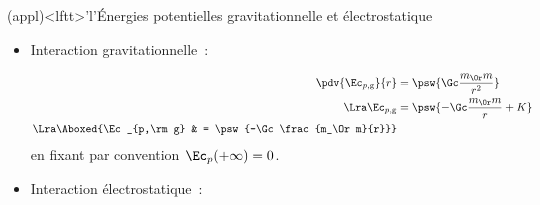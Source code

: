 \documentclass[../../main/main.tex]{subfiles}
\begin{document}
\begin{tcb*}(appl)<lftt>'l'{Énergies potentielles gravitationnelle et
	électrostatique}
	\begin{itemize}
		\item Interaction gravitationnelle~:
		      \vspace{-15pt}
		      \smallbreak
		      \begin{minipage}{0.45\linewidth}
			      \begin{align*}
				      \pdv{\Ec_{p,\rm g}}{r} & = \psw{\Gc \frac{m_\Or m}{r^2}}
				      \\\Lra
				      \Ec_{p,\rm g}          & = \psw{-\Gc \frac{m_\Or m}{r} + K}
				      \\\Lra
				      \Aboxed{\Ec_{p,\rm g}  & = \psw{-\Gc \frac{m_\Or m}{r}}}
			      \end{align*}
			      en fixant par convention $\Ec_p(+\infty) = 0$.
		      \end{minipage}
		      \hfill
		      \begin{minipage}{0.45\linewidth}
			      \begin{center}
				      \vspace{-15pt}
			      \end{center}
		      \end{minipage}
		\item Interaction électrostatique~:
		      \vspace{-15pt}

\end{itemize}
\end{tcb*}
\end{document}
